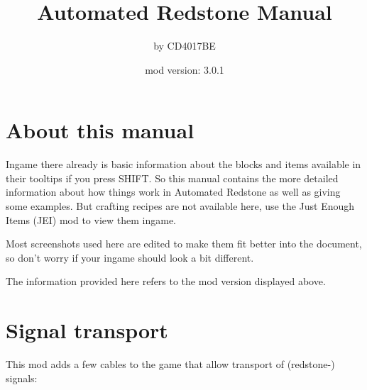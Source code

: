 \documentclass[11pt]{article} %
\title{Automated Redstone Manual}
\author{by CD4017BE}
\date{mod version: 3.0.1}
\begin{document}
 \maketitle
 \tableofcontents
 
 \section{About this manual}  
Ingame there already is basic information about the blocks and items available in their tooltips if you press SHIFT. So this manual contains the more detailed information about how things work in Automated Redstone as well as giving some examples. But crafting recipes are not available here, use the Just Enough Items (JEI) mod to view them ingame.

Most screenshots used here are edited to make them fit better into the document, so don't worry if your ingame should look a bit different. 

The information provided here refers to the mod version displayed above.

\newpage
\section{Signal transport}
This mod adds a few cables to the game that allow transport of (redstone-) signals: 
\end{document}
